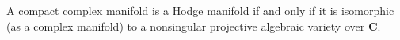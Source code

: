 A compact complex manifold is a Hodge manifold if and only if it is isomorphic (as a complex manifold) to a nonsingular projective algebraic variety over $\mathbf{C}$.
